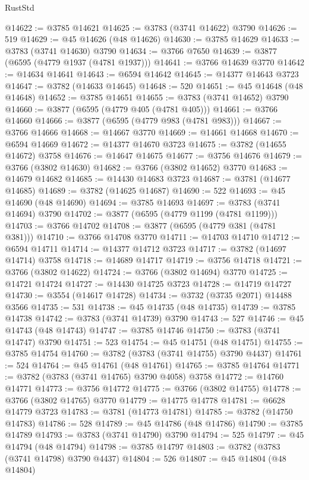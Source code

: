 \begin{lexlean}{RustStd}
\begin{coremodule}
@14622 := @3785 @14621
@14625 := @3783 (@3741 @14622) @3790
@14626 := 519
@14629 := @45 @14626 (@48 @14626)
@14630 := @3785 @14629
@14633 := @3783 (@3741 @14630) @3790
@14634 := @3766 @7650
@14639 := @3877 (@6595 (@4779 @1937 (@4781 @1937)))
@14641 := @3766 @14639 @3770
@14642 := @14634 @14641
@14643 := @6594 @14642
@14645 := @14377 @14643 @3723
@14647 := @3782 (@14633 @14645)
@14648 := 520
@14651 := @45 @14648 (@48 @14648)
@14652 := @3785 @14651
@14655 := @3783 (@3741 @14652) @3790
@14660 := @3877 (@6595 (@4779 @405 (@4781 @405)))
@14661 := @3766 @14660
@14666 := @3877 (@6595 (@4779 @983 (@4781 @983)))
@14667 := @3766 @14666
@14668 := @14667 @3770
@14669 := @14661 @14668
@14670 := @6594 @14669
@14672 := @14377 @14670 @3723
@14675 := @3782 (@14655 @14672) @3758
@14676 := @14647 @14675
@14677 := @3756 @14676
@14679 := @3766 (@3802 @14630)
@14682 := @3766 (@3802 @14652) @3770
@14683 := @14679 @14682
@14685 := @14430 @14683 @3723
@14687 := @3781 (@14677 @14685)
@14689 := @3782 (@14625 @14687)
@14690 := 522
@14693 := @45 @14690 (@48 @14690)
@14694 := @3785 @14693
@14697 := @3783 (@3741 @14694) @3790
@14702 := @3877 (@6595 (@4779 @1199 (@4781 @1199)))
@14703 := @3766 @14702
@14708 := @3877 (@6595 (@4779 @381 (@4781 @381)))
@14710 := @3766 @14708 @3770
@14711 := @14703 @14710
@14712 := @6594 @14711
@14714 := @14377 @14712 @3723
@14717 := @3782 (@14697 @14714) @3758
@14718 := @14689 @14717
@14719 := @3756 @14718
@14721 := @3766 (@3802 @14622)
@14724 := @3766 (@3802 @14694) @3770
@14725 := @14721 @14724
@14727 := @14430 @14725 @3723
@14728 := @14719 @14727
@14730 := @3554 (@14617 @14728)
@14734 := @3732 (@3735 @2071) @14488 @3566
@14735 := 531
@14738 := @45 @14735 (@48 @14735)
@14739 := @3785 @14738
@14742 := @3783 (@3741 @14739) @3790
@14743 := 527
@14746 := @45 @14743 (@48 @14743)
@14747 := @3785 @14746
@14750 := @3783 (@3741 @14747) @3790
@14751 := 523
@14754 := @45 @14751 (@48 @14751)
@14755 := @3785 @14754
@14760 := @3782 (@3783 (@3741 @14755) @3790 @4437)
@14761 := 524
@14764 := @45 @14761 (@48 @14761)
@14765 := @3785 @14764
@14771 := @3782 (@3783 (@3741 @14765) @3790 @4058) @3758
@14772 := @14760 @14771
@14773 := @3756 @14772
@14775 := @3766 (@3802 @14755)
@14778 := @3766 (@3802 @14765) @3770
@14779 := @14775 @14778
@14781 := @6628 @14779 @3723
@14783 := @3781 (@14773 @14781)
@14785 := @3782 (@14750 @14783)
@14786 := 528
@14789 := @45 @14786 (@48 @14786)
@14790 := @3785 @14789
@14793 := @3783 (@3741 @14790) @3790
@14794 := 525
@14797 := @45 @14794 (@48 @14794)
@14798 := @3785 @14797
@14803 := @3782 (@3783 (@3741 @14798) @3790 @4437)
@14804 := 526
@14807 := @45 @14804 (@48 @14804)

\end{coremodule}
\end{lexlean}
